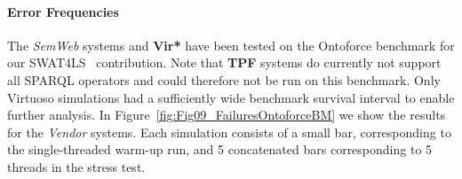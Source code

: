 %




%



\paragraph{Error Frequencies}

The \emph{SemWeb} systems and \textbf{Vir*} have been tested on the Ontoforce benchmark for our SWAT4LS~\cite{dewitte_swat4ls_2016} contribution. Note that \textbf{TPF} systems do currently not support all SPARQL operators and could therefore not be run on this benchmark. Only Virtuoso simulations had a sufficiently wide benchmark survival interval to enable further analysis. In Figure~\ref{fig:Fig09_FailuresOntoforceBM} we show the results for the \emph{Vendor} systems. Each simulation consists of a small bar, corresponding to the single-threaded warm-up run, and 5 concatenated bars corresponding to 5 threads in the stress test.

